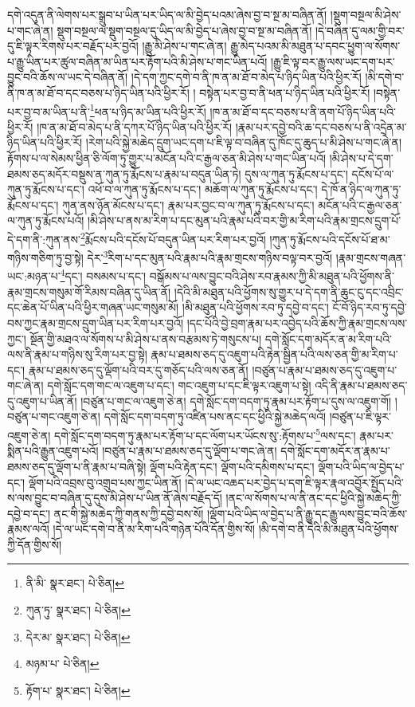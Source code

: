 དགེ་འདུན་ནི་ལེགས་པར་སྒྲུབ་པ་ཡིན་པར་ཡིད་ལ་མི་བྱེད་པའམ་ཞེས་བྱ་བ་སྔ་མ་བཞིན་ནོ། །སྡུག་བསྔལ་མི་ཤེས་པ་གང་ཞེ་ན། སྡུག་བསྔལ་ལ་སྡུག་བསྔལ་དུ་ཡིད་ལ་མི་བྱེད་པ་ཞེས་བྱ་བ་སྔ་མ་བཞིན་ནོ། །དེ་བཞིན་དུ་ལམ་གྱི་བར་དུ་ཇི་ལྟར་རིགས་པར་བརྗོད་པར་བྱའོ། །རྒྱུ་མི་ཤེས་པ་གང་ཞེ་ན། རྒྱུ་མེད་པའམ་མི་མཐུན་པ་དབང་ཕྱུག་ལ་སོགས་པ་རྒྱུ་ཡིན་པར་ཚུལ་བཞིན་མ་ཡིན་པར་རྟོག་པའི་མི་ཤེས་པ་གང་ཡིན་པའོ། །རྒྱུ་ཇི་ལྟ་བར་རྒྱུ་ལས་ཡང་དག་པར་བྱུང་བའི་ཆོས་ལ་ཡང་དེ་བཞིན་ནོ། །དེ་དག་ཀྱང་དགེ་བ་ནི་ཁ་ན་མ་ཐོ་བ་མེད་པ་ཉིད་ཡིན་པའི་ཕྱིར་རོ། །མི་དགེ་བ་ནི་ཁ་ན་མ་ཐོ་བ་དང་བཅས་པ་ཉིད་ཡིན་པའི་ཕྱིར་རོ། །
བསྟེན་པར་བྱ་བ་ནི་ཕན་པ་ཉིད་ཡིན་པའི་ཕྱིར་རོ། །བསྟེན་པར་བྱ་བ་མ་ཡིན་པ་ནི་\footnote{ནི་མི་  སྣར་ཐང་།  པེ་ཅིན། }ཕན་པ་ཉིད་མ་ཡིན་པའི་ཕྱིར་རོ། །ཁ་ན་མ་ཐོ་བ་དང་བཅས་པ་ནི་ནག་པོ་ཉིད་ཡིན་པའི་ཕྱིར་རོ། །ཁ་ན་མ་ཐོ་བ་མེད་པ་ནི་དཀར་པོ་ཉིད་ཡིན་པའི་ཕྱིར་རོ། །རྣམ་པར་དབྱེ་བའི་ཆ་དང་བཅས་པ་ནི་འདྲེན་མ་ཉིད་ཡིན་པའི་ཕྱིར་རོ། །རེག་པའི་སྐྱེ་མཆེད་དྲུག་ཡང་དག་པ་ཇི་ལྟ་བ་བཞིན་དུ་ཁོང་དུ་ཆུད་པ་མི་ཤེས་པ་གང་ཞེ་ན། རྟོགས་པ་ལ་སེམས་ཕྱིན་ཅི་ལོག་ཏུ་གྱུར་པ་མངོན་པའི་ང་རྒྱལ་ཅན་མི་ཤེས་པ་གང་ཡིན་པའོ། །མི་ཤེས་པ་དེ་དག་ཐམས་ཅད་མདོར་བསྡུས་ན་ཀུན་ཏུ་རྨོངས་པ་རྣམ་པ་བདུན་ཡིན་ཏེ། དུས་ལ་ཀུན་ཏུ་རྨོངས་པ་དང་། དངོས་པོ་ལ་ཀུན་ཏུ་རྨོངས་པ་དང་། འཕོ་བ་ལ་ཀུན་ཏུ་རྨོངས་པ་དང་། མཆོག་ལ་ཀུན་ཏུ་རྨོངས་པ་དང་། དེ་ཁོ་ན་ཉིད་ལ་ཀུན་ཏུ་རྨོངས་པ་དང་། ཀུན་ནས་ཉོན་མོངས་པ་དང་། རྣམ་པར་བྱང་བ་ལ་ཀུན་ཏུ་རྨོངས་པ་དང་། མངོན་པའི་ང་རྒྱལ་ཅན་ལ་ཀུན་ཏུ་རྨོངས་པའོ། །མི་ཤེས་པ་ནས་མ་རིག་པ་དང་མུན་པའི་རྣམ་པའི་བར་གྱི་མ་རིག་པའི་རྣམ་གྲངས་དྲུག་པོ་དེ་དག་ནི་:ཀུན་ནས་\footnote{ཀུན་ཏུ་  སྣར་ཐང་།  པེ་ཅིན། }རྨོངས་པའི་དངོས་པོ་བདུན་ཡིན་པར་རིག་པར་བྱའོ། །ཀུན་ཏུ་རྨོངས་པའི་དངོས་པོ་ཐ་མ་གཉིས་གཅིག་ཏུ་བྱ་སྟེ། དེར་\footnote{དེར་མ་  སྣར་ཐང་།  པེ་ཅིན། }རིག་པ་དང་མུན་པའི་རྣམ་པའི་རྣམ་གྲངས་གཉིས་བལྟ་བར་བྱའོ། །རྣམ་གྲངས་གཞན་ཡང་:མཉན་པ་\footnote{མཉམ་པ་  པེ་ཅིན། }དང་། བསམས་པ་དང་། བསྒོམས་པ་ལས་བྱུང་བའི་ཤེས་རབ་རྣམས་ཀྱི་མི་མཐུན་པའི་ཕྱོགས་ནི་རྣམ་གྲངས་གསུམ་གོ་རིམས་བཞིན་དུ་ཡིན་ནོ། །དེའི་མི་མཐུན་པའི་ཕྱོགས་སུ་གྱུར་པ་དེ་དག་ནི་ཆུང་ངུ་དང་འབྲིང་དང་ཆེན་པོ་ཡིན་པའི་ཕྱིར་གཞན་ཡང་གསུམ་མོ། །མི་མཐུན་པའི་ཕྱོགས་རབ་ཏུ་དབྱེ་བ་དང་། ངོ་བོ་ཉིད་རབ་ཏུ་དབྱེ་བས་ཀྱང་རྣམ་གྲངས་དྲུག་ཡིན་པར་རིག་པར་བྱའོ། །དང་པོའི་བྱེ་བྲག་རྣམ་པར་འབྱེད་པའི་ཆོས་ཀྱི་རྣམ་གྲངས་ལས་ཀྱང་། སྔོན་གྱི་མཐའ་ལ་སོགས་པ་མི་ཤེས་པ་ནས་བརྩམས་ཏེ་གསུངས་པ། དགེ་སློང་དག་མདོར་ན་མ་རིག་པའི་ལས་ནི་རྣམ་པ་གཉིས་སུ་རིག་པར་བྱ་སྟེ། རྣམ་པ་ཐམས་ཅད་དུ་འཇུག་པའི་རྟེན་སྦྱིན་པའི་ལས་ཅན་གྱི་མ་རིག་པ་དང་། རྣམ་པ་ཐམས་ཅད་དུ་ལྡོག་པའི་བར་དུ་གཅོད་པའི་ལས་ཅན་ནོ། །བཙུན་པ་རྣམ་པ་ཐམས་ཅད་དུ་འཇུག་པ་གང་ཞེ་ན། དགེ་སློང་དག་གང་ལ་འཇུག་པ་དང་། གང་འཇུག་པ་དང་ཇི་ལྟར་འཇུག་པ་སྟེ། འདི་ནི་རྣམ་པ་ཐམས་ཅད་དུ་འཇུག་པ་ཡིན་ནོ། །བཙུན་པ་གང་ལ་འཇུག་ཅེ་ན། དགེ་སློང་དག་བདག་ཏུ་རྣམ་པར་རྟོག་པ་དུས་ལ་འཇུག་གོ། །བཙུན་པ་གང་འཇུག་ཅེ་ན། དགེ་སློང་དག་བདག་ཏུ་འཛིན་པས་ནང་དང་ཕྱིའི་སྐྱེ་མཆེད་ལའོ། །བཙུན་པ་ཇི་ལྟར་འཇུག་ཅེ་ན། དགེ་སློང་དག་བདག་ཏུ་རྣམ་པར་རྟོག་པ་དང་ལོག་པར་ཡོངས་སུ་:རྟོགས་པ་\footnote{རྟོག་པ་  སྣར་ཐང་།  པེ་ཅིན། }ལས་དང་། རྣམ་པར་སྨིན་པའི་རྒྱུན་འཇུག་པའོ། །བཙུན་པ་རྣམ་པ་ཐམས་ཅད་དུ་ལྡོག་པ་གང་ཞེ་ན། དགེ་སློང་དག་མདོར་ན་རྣམ་པ་ཐམས་ཅད་དུ་ལྡོག་པ་ནི་རྣམ་པ་བཞི་སྟེ། ལྡོག་པའི་རྟེན་དང་། ལྡོག་པའི་དམིགས་པ་དང་། ལྡོག་པའི་ཡིད་ལ་བྱེད་པ་དང་། ལྡོག་པའི་འབྲས་བུ་འགྲུབ་པས་ཀྱང་ཡིན་ནོ། །དེ་ལ་ཡང་འཆད་པར་བྱེད་པ་དག་ཇི་ལྟར་རྣལ་འབྱོར་སྤྱོད་པའི་ས་ལས་བྱུང་བ་བཞིན་དུ་དུས་མི་ཤེས་པ་ཡིན་ནོ་ཞེས་བརྗོད་དོ། །ནང་ལ་སོགས་པ་ལ་ནི་ནང་དང་ཕྱིའི་སྐྱེ་མཆེད་ཀྱི་དབྱེ་བ་དང་། ནང་གི་སྐྱེ་མཆེད་ཀྱི་གནས་ཀྱི་དབྱེ་བས་སོ། །ལྡོག་པའི་ཡིད་ལ་བྱེད་པ་ནི་རྒྱུ་དང་རྒྱུ་ལས་བྱུང་བའི་ཆོས་རྣམས་ལའོ། །དེ་ལ་ཡང་དགེ་བ་ནི་མ་རིག་པའི་གཉེན་པོའི་དོན་གྱིས་སོ། །མི་དགེ་བ་ནི་དེའི་མི་མཐུན་པའི་ཕྱོགས་ཀྱི་དོན་གྱིས་སོ། 